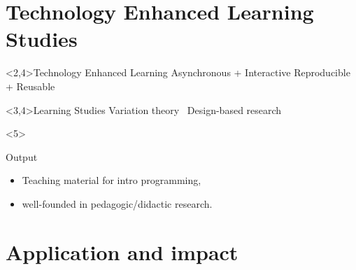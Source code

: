 \mode*

\section{Technology Enhanced Learning Studies}

\begin{frame}
  \begin{block}<2,4>{Technology Enhanced Learning}
    \hitem Asynchronous + Interactive
    \quad
    \hitem Reproducible + Reusable
  \end{block}

  \begin{center}
    \Large\bfseries
  \end{center}

  \begin{block}<3,4>{Learning Studies}
    \hitem Variation theory~\cite{VariationTheory}
    \qquad
    \hitem Design-based research~\cite{DesignBasedResearch}
  \end{block}

  \begin{onlyenv}<5>
    \begin{alertblock}{Output}
      \begin{itemize}
        \item Teaching material for intro programming,
        \item well-founded in pedagogic/didactic research.
      \end{itemize}
    \end{alertblock}
  \end{onlyenv}
\end{frame}

\section{Application and impact}


